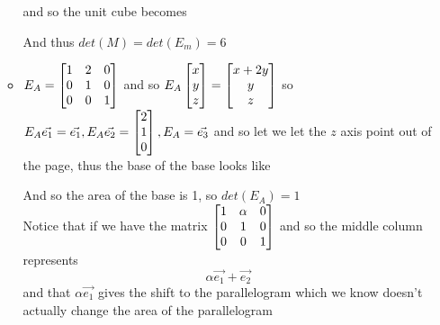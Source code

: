 \documentclass[11pt]{book}
\begin{document}
\begin{itemize}
\begin{itemize}
\[                \]
                and so the unit cube becomes
                \begin{center}
                \end{center}
            And thus $\mathit{det} \left(M\right) = \mathit{det} \left(E_{m} \right) = 6$ 
            \item $E_{A} = \begin{bmatrix} 1 & 2 & 0 \\ 0 & 1 & 0 \\ 0 & 0 & 1 \end{bmatrix}$ and so $E_{A} \begin{bmatrix} x \\ y \\ z \end{bmatrix} = \begin{bmatrix} x + 2y \\ y \\ z \end{bmatrix} $ so $E_{A} \vec{e_1} = \vec{e_1} , E_{A} \vec{e_2} = \begin{bmatrix} 2 \\ 1 \\ 0 \end{bmatrix} , E_{A} = \vec{e_3} $ and so let we let the $z$ axis point out of the page, thus the base of the base looks like
                \begin{center}
                \end{center}
            And so the area of the base is 1, so $\mathit{det} \left(E_{A} \right) = 1$ \\
            Notice that if we have the matrix $\begin{bmatrix} 1 & \alpha  & 0 \\ 0 & 1 & 0 \\ 0 & 0 & 1 \end{bmatrix}$ and so the middle column represents
            \[
            \alpha \vec{e_1}  + \vec{e_2} 
            \]
            and that $\alpha \vec{e_1} $ gives the shift to the parallelogram which we know doesn't actually change the area of the parallelogram 

\end{itemize}
\end{itemize}
\end{document}
